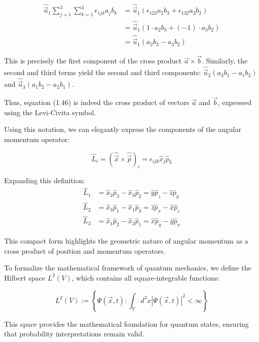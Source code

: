 \documentclass[italian]{HKNdocument}
\begin{document}
\begin{align*}
\hat{\vec{u}}_{1} \sum_{j=1}^{3} \sum_{k=1}^{3} \epsilon_{1 j k} a_{j} b_{k} &= \hat{\vec{u}}_{1}(\epsilon_{123} a_{2} b_{3} + \epsilon_{132} a_{3} b_{2}) \tag{1.48} \\
&= \hat{\vec{u}}_{1}(1 \cdot a_{2} b_{3} + (-1) \cdot a_{3} b_{2}) \\
&= \hat{\vec{u}}_{1}(a_{2} b_{3} - a_{3} b_{2})
\end{align*}

This is precisely the first component of the cross product $\vec{a} \times \vec{b}$. Similarly, the second and third terms yield the second and third components:
$\hat{\vec{u}}_{2}(a_{3} b_{1} - a_{1} b_{3})$ and $\hat{\vec{u}}_{3}(a_{1} b_{2} - a_{2} b_{1})$.

Thus, equation (1.46) is indeed the cross product of vectors $\vec{a}$ and $\vec{b}$, expressed using the Levi-Civita symbol.

Using this notation, we can elegantly express the components of the angular momentum operator:

\begin{equation*}
\hat{L}_{i} = (\hat{\vec{x}} \times \hat{\vec{p}})_{i} = \epsilon_{i j k} \hat{x}_{j} \hat{p}_{k} \tag{1.49}
\end{equation*}

Expanding this definition:
\begin{align*}
\hat{L}_1 &= \hat{x}_2\hat{p}_3 - \hat{x}_3\hat{p}_2 = \hat{y}\hat{p}_z - \hat{z}\hat{p}_y \\
\hat{L}_2 &= \hat{x}_3\hat{p}_1 - \hat{x}_1\hat{p}_3 = \hat{z}\hat{p}_x - \hat{x}\hat{p}_z \\
\hat{L}_3 &= \hat{x}_1\hat{p}_2 - \hat{x}_2\hat{p}_1 = \hat{x}\hat{p}_y - \hat{y}\hat{p}_x
\end{align*}

This compact form highlights the geometric nature of angular momentum as a cross product of position and momentum operators.

To formalize the mathematical framework of quantum mechanics, we define the Hilbert space $L^{2}(V)$, which contains all square-integrable functions:

\begin{equation*}
L^{2}(V) := \left\{\Psi(\vec{x},t) : \int_{V} d^{3}x |\Psi(\vec{x},t)|^{2} < \infty \right\} \tag{1.50}
\end{equation*}

This space provides the mathematical foundation for quantum states, ensuring that probability interpretations remain valid.
\end{document}
